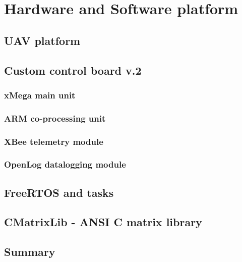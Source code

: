\section{Hardware and Software platform}

\subsection{UAV platform}

\subsection{Custom control board v.2}

\subsubsection{xMega main unit}

\subsubsection{ARM co-processing unit}

\subsubsection{XBee telemetry module}

\subsubsection{OpenLog datalogging module}

\subsection{FreeRTOS and tasks}

\subsection{CMatrixLib - ANSI C matrix library}

\subsection{Summary}